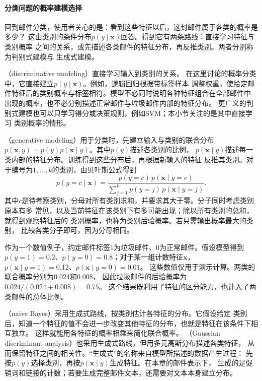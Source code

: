 \paragraph{分类问题的概率建模选择}

回到邮件分类，使用者关心的是：看到这些特征以后，这封邮件属于各类的概率是多少？
这由类别的条件分布$p(y\mid\bm{x})$回答。得到它有两条路线：直接学习特征与类别概率
之间的关系，或先描述各类邮件的特征分布，再反推类别。两者分别称为判别式建模与
生成式建模。

（discriminative modeling）直接学习输入到类别的关系。
在这里讨论的概率分类中，它直接建立$p(y\mid\bm{x})$。例如，逻辑回归根据带标签样本
调整权重，使给定邮件特征后的类别概率与标签相符。模型不必同时说明各种特征组合在全部邮件中
出现的概率，也不必分别描述正常邮件与垃圾邮件内部的特征分布。
更广义的判别式建模也可以只学习得分或决策规则，例如SVM；本小节关注的是其中直接学习
类别概率的情形。

（generative modeling）用于分类时，先建立输入与类别的联合分布
$p(\bm{x},y)=p(y)p(\bm{x}\mid y)$。其中$p(y)$描述各类别的比例，
$p(\bm{x}\mid y)$描述每一类内部的特征分布。训练得到这些分布后，再根据新输入的特征
反推其类别。对于编号为$1,\ldots,k$的类别，由贝叶斯公式得到
\begin{equation}
  p(y=c\mid\bm{x})
  =\frac{p(y=c)\,p(\bm{x}\mid y=c)}
         {\sum_{j=1}^{k}p(y=j)\,p(\bm{x}\mid y=j)}.
  \label{eq:models-generative-classification}
\end{equation}
其中$c$是待考察类别，分母对所有类别求和，并要求其大于零。分子同时考虑类别原本有多
常见，以及当前特征在该类别下有多可能出现；除以所有类别的总和，就得到观察特征后的
类别概率，也称为类别后验概率。若只需输出概率最大的类别，
比较各类分子即可，因为分母相同。

作为一个数值例子，约定邮件标签$1$为垃圾邮件、$0$为正常邮件。假设模型得到
$p(y=1)=0.2$、$p(y=0)=0.8$；对于某一组计数特征$\bm{x}$，
$p(\bm{x}\mid y=1)=0.12$、$p(\bm{x}\mid y=0)=0.01$。
这些数值仅用于演示计算。两类的联合概率分别为$0.024$和$0.008$，
因此垃圾邮件的后验概率为$0.024/(0.024+0.008)=0.75$。
这个结果既利用了特征的区分能力，也计入了两类邮件的总体比例。

（naive Bayes）采用生成式路线，按类别估计各特征的分布。它假设给定
类别后，知道一个特征的值不会进一步改变其他特征的分布，也就是特征在该条件下相互独立。
这样就能用各特征的概率相乘来简化联合概率。
（Gaussian discriminant analysis）也采用生成式路线，但用多元高斯分布描述各类特征，
从而保留特征之间的相关性。“生成式”的名称来自模型所描述的数据产生过程：
先按$p(y)$选择类别，再按$p(\bm{x}\mid y)$生成特征。在本章的邮件表示下，
生成的是促销词和链接的计数；若要生成完整邮件文本，还需要对文本本身建立分布。

